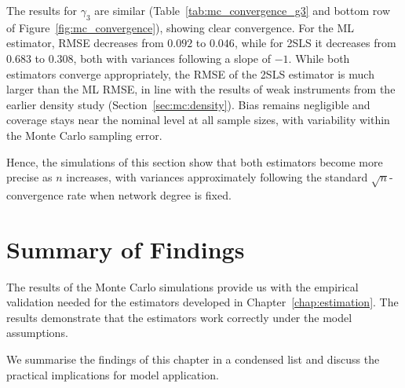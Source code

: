 The results for $\gamma_3$ are similar (Table~\ref{tab:mc_convergence_g3} and bottom row of Figure~\ref{fig:mc_convergence}), showing clear convergence. For the ML estimator, RMSE decreases from $0.092$ to $0.046$, while for 2SLS it decreases from $0.683$ to $0.308$, both with variances following a slope of $-1$. While both estimators converge appropriately, the RMSE of the 2SLS estimator is much larger than the ML RMSE, in line with the results of weak instruments from the earlier density study (Section~\ref{sec:mc:density}). Bias remains negligible and coverage stays near the nominal level at all sample sizes, with variability within the Monte Carlo sampling error.

Hence, the simulations of this section show that both estimators become more precise as $n$ increases, with variances approximately following the standard $\sqrt{n}$-convergence rate when network degree is fixed.

\section{Summary of Findings}
\label{sec:mc:summary}
The results of the Monte Carlo simulations provide us with the empirical validation needed for the estimators developed in Chapter~\ref{chap:estimation}. The results demonstrate that the estimators work correctly under the model assumptions.

We summarise the findings of this chapter in a condensed list and discuss the practical implications for model application.

